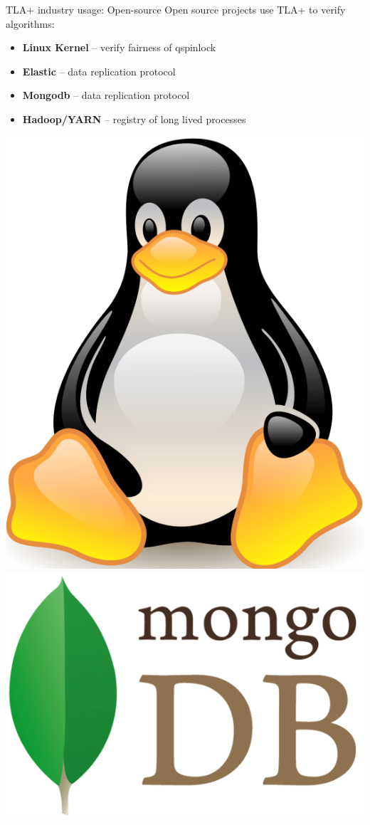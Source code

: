 \documentclass[12pt]{beamer}
\begin{document}
  \begin{frame}{TLA+ industry usage: Open-source}
      Open source projects use TLA+ to verify algorithms:
    \begin{itemize}
        \item \textbf{Linux Kernel} -- verify fairness of qspinlock ~\cite{lkml2018}
        \item \textbf{Elastic} -- data replication protocol~\cite{elastic2017}
        \item \textbf{Mongodb} -- data replication protocol~\cite{mongo2016}
        \item \textbf{Hadoop/YARN} -- registry of long lived processes~\cite{hadoop2017}
    \end{itemize}
    \begin{center}
        \includegraphics[scale=0.07]{figures/tux}
        \includegraphics[scale=0.1]{figures/mongo}

\end{center}
\end{frame}
\end{document}
